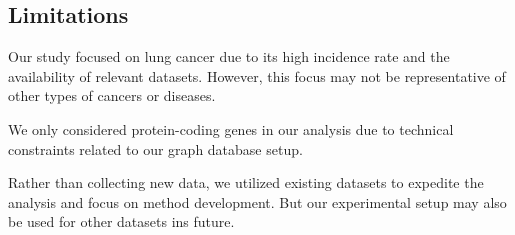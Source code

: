 \subsection{Limitations} \label{subsec:limitations}
Our study focused on lung cancer due to its high incidence rate and the availability of relevant datasets.
However, this focus may not be representative of other types of cancers or diseases.

We only considered protein-coding genes in our analysis due to technical constraints related to our graph database setup.

Rather than collecting new data, we utilized existing datasets to expedite the analysis and focus on method development.
But our experimental setup may also be used for other datasets ins future.\\
